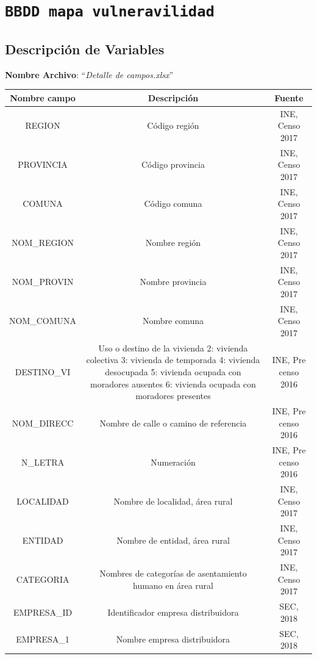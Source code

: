 \documentclass[
]{book}
\begin{document}
\hypertarget{bbdd-mapa-vulneravilidad}{%
\section{\texorpdfstring{\texttt{BBDD\ mapa\ vulneravilidad}}{BBDD mapa vulneravilidad}}\label{bbdd-mapa-vulneravilidad}}

\hypertarget{descripciuxf3n-de-variables}{%
\subsection{Descripción de Variables}\label{descripciuxf3n-de-variables}}

\textbf{Nombre Archivo}: ``\emph{Detalle de campos.xlsx}''

\begin{table}
\centering
\begin{tabular}{c|c|c}
\hline
Nombre campo & Descripción & Fuente\\
\hline
REGION & Código región & INE, Censo 2017\\
\hline
PROVINCIA & Código provincia & INE, Censo 2017\\
\hline
COMUNA & Código comuna & INE, Censo 2017\\
\hline
NOM\_REGION & Nombre región & INE, Censo 2017\\
\hline
NOM\_PROVIN & Nombre provincia & INE, Censo 2017\\
\hline
NOM\_COMUNA & Nombre comuna & INE, Censo 2017\\
\hline
DESTINO\_VI & Uso o destino de la vivienda 
2: vivienda colectiva
3: vivienda de temporada
4: vivienda desocupada
5: vivienda ocupada con moradores ausentes
6: vivienda ocupada con moradores presentes & INE, Pre censo 2016\\
\hline
NOM\_DIRECC & Nombre de calle o camino de referencia & INE, Pre censo 2016\\
\hline
N\_LETRA & Numeración & INE, Pre censo 2016\\
\hline
LOCALIDAD & Nombre de localidad, área rural & INE, Censo 2017\\
\hline
ENTIDAD & Nombre de entidad, área rural & INE, Censo 2017\\
\hline
CATEGORIA & Nombres de categorías de asentamiento humano en área rural & INE, Censo 2017\\
\hline
EMPRESA\_ID & Identificador empresa distribuidora & SEC, 2018\\
\hline
EMPRESA\_1 & Nombre empresa distribuidora & SEC, 2018\\

\end{tabular}
\end{table}
\end{document}
